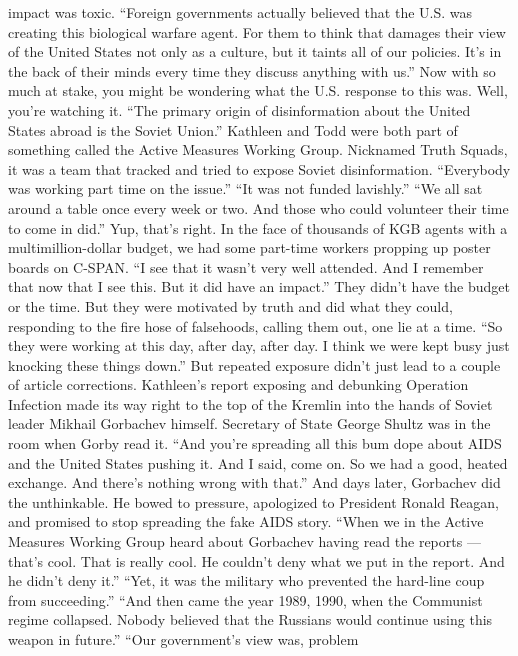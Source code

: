 \begin{itemize}
  impact was toxic. ``Foreign governments actually believed that the
  U.S. was creating this biological warfare agent. For them to think
  that damages their view of the United States not only as a culture,
  but it taints all of our policies. It's in the back of their minds
  every time they discuss anything with us.'' Now with so much at stake,
  you might be wondering what the U.S. response to this was. Well,
  you're watching it. ``The primary origin of disinformation about the
  United States abroad is the Soviet Union.'' Kathleen and Todd were
  both part of something called the Active Measures Working Group.
  Nicknamed Truth Squads, it was a team that tracked and tried to expose
  Soviet disinformation. ``Everybody was working part time on the
  issue.'' ``It was not funded lavishly.'' ``We all sat around a table
  once every week or two. And those who could volunteer their time to
  come in did.'' Yup, that's right. In the face of thousands of KGB
  agents with a multimillion-dollar budget, we had some part-time
  workers propping up poster boards on C-SPAN. ``I see that it wasn't
  very well attended. And I remember that now that I see this. But it
  did have an impact.'' They didn't have the budget or the time. But
  they were motivated by truth and did what they could, responding to
  the fire hose of falsehoods, calling them out, one lie at a time. ``So
  they were working at this day, after day, after day. I think we were
  kept busy just knocking these things down.'' But repeated exposure
  didn't just lead to a couple of article corrections. Kathleen's report
  exposing and debunking Operation Infection made its way right to the
  top of the Kremlin into the hands of Soviet leader Mikhail Gorbachev
  himself. Secretary of State George Shultz was in the room when Gorby
  read it. ``And you're spreading all this bum dope about AIDS and the
  United States pushing it. And I said, come on. So we had a good,
  heated exchange. And there's nothing wrong with that.'' And days
  later, Gorbachev did the unthinkable. He bowed to pressure, apologized
  to President Ronald Reagan, and promised to stop spreading the fake
  AIDS story. ``When we in the Active Measures Working Group heard about
  Gorbachev having read the reports --- that's cool. That is really
  cool. He couldn't deny what we put in the report. And he didn't deny
  it.'' ``Yet, it was the military who prevented the hard-line coup from
  succeeding.'' ``And then came the year 1989, 1990, when the Communist
  regime collapsed. Nobody believed that the Russians would continue
  using this weapon in future.'' ``Our government's view was, problem

\end{itemize}
